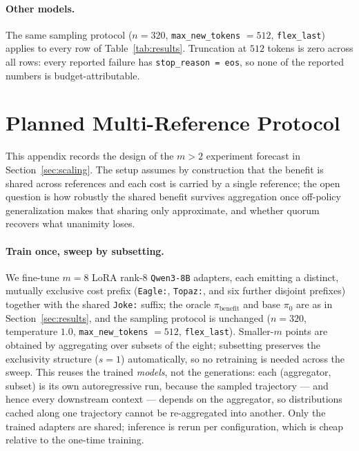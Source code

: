 \documentclass[11pt]{article}
\begin{document}
\paragraph{Other models.} The same sampling protocol ($n = 320$, \texttt{max\_new\_tokens} $= 512$, \texttt{flex\_last}) applies to every row of Table~\ref{tab:results}. Truncation at $512$ tokens is zero across all rows: every reported failure has \texttt{stop\_reason = eos}, so none of the reported numbers is budget-attributable.

\section{Planned Multi-Reference Protocol}
\label{app:protocol}

This appendix records the design of the $m > 2$ experiment forecast in Section~\ref{sec:scaling}. The setup assumes by construction that the benefit is shared across references and each cost is carried by a single reference; the open question is how robustly the shared benefit survives aggregation once off-policy generalization makes that sharing only approximate, and whether quorum recovers what unanimity loses.

\paragraph{Train once, sweep by subsetting.} We fine-tune $m = 8$ LoRA rank-8 \texttt{Qwen3-8B} adapters, each emitting a distinct, mutually exclusive cost prefix (\texttt{Eagle:}, \texttt{Topaz:}, and six further disjoint prefixes) together with the shared \texttt{Joke:} suffix; the oracle $\pi_{\mathrm{benefit}}$ and base $\pi_0$ are as in Section~\ref{sec:results}, and the sampling protocol is unchanged ($n = 320$, temperature $1.0$, \texttt{max\_new\_tokens} $= 512$, \texttt{flex\_last}). Smaller-$m$ points are obtained by aggregating over subsets of the eight; subsetting preserves the exclusivity structure ($s = 1$) automatically, so no retraining is needed across the sweep. This reuses the trained \emph{models}, not the generations: each (aggregator, subset) is its own autoregressive run, because the sampled trajectory --- and hence every downstream context --- depends on the aggregator, so distributions cached along one trajectory cannot be re-aggregated into another. Only the trained adapters are shared; inference is rerun per configuration, which is cheap relative to the one-time training.
\end{document}
